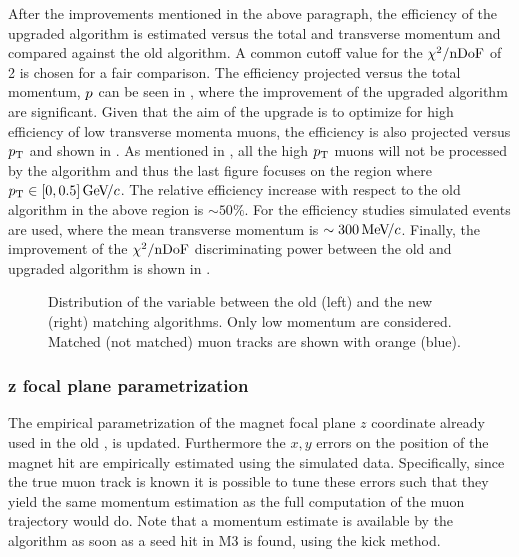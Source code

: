 After the improvements mentioned in the above paragraph, the efficiency of the upgraded \mvTTm algorithm
is estimated versus the total and transverse momentum and compared against the old algorithm. A common cutoff value for
the $\chi^2/{\rm nDoF}$ of 2 is chosen for a fair comparison. The efficiency projected versus the total momentum, $\mbox{$p$}$
can be seen in , where the improvement of the upgraded \mvTTm algorithm are significant.
Given that the aim of the \mvTTm upgrade is to optimize for high efficiency of low transverse momenta muons,
the efficiency is also projected versus $\mbox{$p_{\rm T}$}$ and shown in . As mentioned
in , all the high $\mbox{$p_{\rm T}$}$ muons will not be processed by the \mvTTm algorithm and thus
the last figure focuses on the region where $\mbox{$p_{\rm T}$}\in[0,0.5]{\mathrm{\,Ge\kern -0.1em V\!/}c}$. The relative efficiency increase with
respect to the old \mvm algorithm in the above region is $\sim 50\%$. For the efficiency studies \Sigmapmumu
simulated events are used, where the mean transverse momentum is $\sim 300{\mathrm{\,Me\kern -0.1em V\!/}c}$. Finally, the improvement
of the $\chi^2/{\rm nDoF}$ discriminating power between the old and upgraded algorithm is shown in .

\begin{figure}[t]
  \centering
  \begin{subfigure}{0.5\textwidth}
    \raggedright
    \scalebox{.6}{}
    \caption{}
    \label{mvTTm_chi2}
  \end{subfigure}%
  \hfill%
  \begin{subfigure}{0.5\textwidth}
    \raggedleft
    \scalebox{.6}{}
    \caption{}
    \label{mvm_chi2}
  \end{subfigure}
  \caption{Distribution of the \chisq variable between the old (left) and the new (right) matching algorithms.
           Only low momentum \veloTracks are considered. Matched (not matched) muon tracks are shown with orange (blue).}
 \label{mvm_chi2_comp}
\end{figure}

\subsubsection{z focal plane parametrization}
The empirical parametrization of the magnet focal plane $z$ coordinate already used in the old \mvm\cite{roelThesis},
is updated. Furthermore the $x,y$ errors on the position of the magnet hit are empirically estimated using the simulated data.
Specifically, since the true muon track is known it is possible to tune these errors such that they yield the same momentum
estimation as the full computation of the muon trajectory would do. Note that a momentum estimate is available by the
\mvTTm algorithm as soon as a seed hit in M3 is found, using the kick method.

